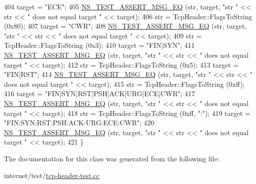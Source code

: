 \begin{DoxyCode}
404   target = \textcolor{stringliteral}{"ECE"};
405   \hyperlink{group__testing_ga2a9d78cffb3db8e867c35fff0b698cf5}{NS\_TEST\_ASSERT\_MSG\_EQ} (str, target, \textcolor{stringliteral}{"str "} << str <<  \textcolor{stringliteral}{" does not equal target "} << 
      target);
406   str = TcpHeader::FlagsToString (0x80);
407   target = \textcolor{stringliteral}{"CWR"};
408   \hyperlink{group__testing_ga2a9d78cffb3db8e867c35fff0b698cf5}{NS\_TEST\_ASSERT\_MSG\_EQ} (str, target, \textcolor{stringliteral}{"str "} << str <<  \textcolor{stringliteral}{" does not equal target "} << 
      target);
409   str = TcpHeader::FlagsToString (0x3);
410   target = \textcolor{stringliteral}{"FIN|SYN"};
411   \hyperlink{group__testing_ga2a9d78cffb3db8e867c35fff0b698cf5}{NS\_TEST\_ASSERT\_MSG\_EQ} (str, target, \textcolor{stringliteral}{"str "} << str <<  \textcolor{stringliteral}{" does not equal target "} << 
      target);
412   str = TcpHeader::FlagsToString (0x5);
413   target = \textcolor{stringliteral}{"FIN|RST"};
414   \hyperlink{group__testing_ga2a9d78cffb3db8e867c35fff0b698cf5}{NS\_TEST\_ASSERT\_MSG\_EQ} (str, target, \textcolor{stringliteral}{"str "} << str <<  \textcolor{stringliteral}{" does not equal target "} << 
      target);
415   str = TcpHeader::FlagsToString (0xff);
416   target = \textcolor{stringliteral}{"FIN|SYN|RST|PSH|ACK|URG|ECE|CWR"};
417   \hyperlink{group__testing_ga2a9d78cffb3db8e867c35fff0b698cf5}{NS\_TEST\_ASSERT\_MSG\_EQ} (str, target, \textcolor{stringliteral}{"str "} << str <<  \textcolor{stringliteral}{" does not equal target "} << 
      target);
418   str = TcpHeader::FlagsToString (0xff, \textcolor{stringliteral}{":"});
419   target = \textcolor{stringliteral}{"FIN:SYN:RST:PSH:ACK:URG:ECE:CWR"};
420   \hyperlink{group__testing_ga2a9d78cffb3db8e867c35fff0b698cf5}{NS\_TEST\_ASSERT\_MSG\_EQ} (str, target, \textcolor{stringliteral}{"str "} << str <<  \textcolor{stringliteral}{" does not equal target "} << 
      target);
421 \}
\end{DoxyCode}


The documentation for this class was generated from the following file\+:\begin{DoxyCompactItemize}
\item 
internet/test/\hyperlink{tcp-header-test_8cc}{tcp-\/header-\/test.\+cc}\end{DoxyCompactItemize}
